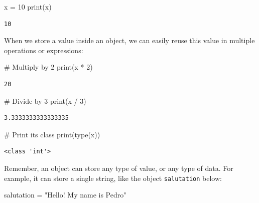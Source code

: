 \documentclass[
  11pt,
  letterpaper,
  DIV=11,
  numbers=noendperiod]{scrreprt}
\newenvironment{Shaded}{\begin{snugshade}}{\end{snugshade}}
\newcommand{\BuiltInTok}[1]{\textcolor[rgb]{0.00,0.23,0.31}{#1}}
\newcommand{\CommentTok}[1]{\textcolor[rgb]{0.37,0.37,0.37}{#1}}
\newcommand{\DecValTok}[1]{\textcolor[rgb]{0.68,0.00,0.00}{#1}}
\newcommand{\NormalTok}[1]{\textcolor[rgb]{0.00,0.23,0.31}{#1}}
\newcommand{\OperatorTok}[1]{\textcolor[rgb]{0.37,0.37,0.37}{#1}}
\newcommand{\StringTok}[1]{\textcolor[rgb]{0.13,0.47,0.30}{#1}}
\begin{document}
\begin{Shaded}
\begin{Highlighting}[]
\NormalTok{x }\OperatorTok{=} \DecValTok{10}
\BuiltInTok{print}\NormalTok{(x)}
\end{Highlighting}
\end{Shaded}

\begin{verbatim}
10
\end{verbatim}

When we store a value inside an object, we can easily reuse this value
in multiple operations or expressions:

\begin{Shaded}
\begin{Highlighting}[]
\CommentTok{\# Multiply by 2}
\BuiltInTok{print}\NormalTok{(x }\OperatorTok{*} \DecValTok{2}\NormalTok{)}
\end{Highlighting}
\end{Shaded}

\begin{verbatim}
20
\end{verbatim}

\begin{Shaded}
\begin{Highlighting}[]
\CommentTok{\# Divide by 3}
\BuiltInTok{print}\NormalTok{(x }\OperatorTok{/} \DecValTok{3}\NormalTok{)}
\end{Highlighting}
\end{Shaded}

\begin{verbatim}
3.3333333333333335
\end{verbatim}

\begin{Shaded}
\begin{Highlighting}[]
\CommentTok{\# Print its class}
\BuiltInTok{print}\NormalTok{(}\BuiltInTok{type}\NormalTok{(x))}
\end{Highlighting}
\end{Shaded}

\begin{verbatim}
<class 'int'>
\end{verbatim}

Remember, an object can store any type of value, or any type of data.
For example, it can store a single string, like the object
\texttt{salutation} below:

\begin{Shaded}
\begin{Highlighting}[]
\NormalTok{salutation }\OperatorTok{=} \StringTok{"Hello! My name is Pedro"}
\end{Highlighting}
\end{Shaded}
\end{document}

